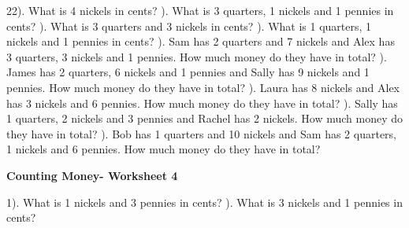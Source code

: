 \documentclass{article}%
\begin{document}
22). What is 4 nickels in cents?%
\newline%
\newline%
). What is 3 quarters, 1 nickels and 1 pennies in cents?%
\newline%
\newline%
). What is 3 quarters and 3 nickels in cents?%
\newline%
\newline%
). What is 1 quarters, 1 nickels and 1 pennies in cents?%
\newline%
\newline%
). Sam has 2 quarters and 7 nickels and Alex has 3 quarters, 3 nickels and 1 pennies. How much money do they have in total?%
\newline%
\newline%
). James has 2 quarters, 6 nickels and 1 pennies and Sally has 9 nickels and 1 pennies. How much money do they have in total?%
\newline%
\newline%
). Laura has 8 nickels and Alex has 3 nickels and 6 pennies. How much money do they have in total?%
\newline%
\newline%
). Sally has 1 quarters, 2 nickels and 3 pennies and Rachel has 2 nickels. How much money do they have in total?%
\newline%
\newline%
). Bob has 1 quarters and 10 nickels and Sam has 2 quarters, 1 nickels and 6 pennies. How much money do they have in total?%
\newline%
\newline%
\newline%
\pagebreak%
\large%
\begin{center}%
\textbf{Counting Money- Worksheet 4}%
\newline%
\end{center} \normalsize%
1). What is 1 nickels and 3 pennies in cents?%
\newline%
\newline%
). What is 3 nickels and 1 pennies in cents?%
\end{document}
